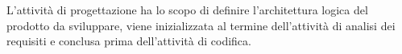 L'attivit\`{a} di progettazione ha lo scopo di definire l'architettura logica del prodotto da sviluppare, viene inizializzata al termine dell'attivit\`{a} di analisi dei requisiti e conclusa prima dell'attivit\`{a} di codifica. 